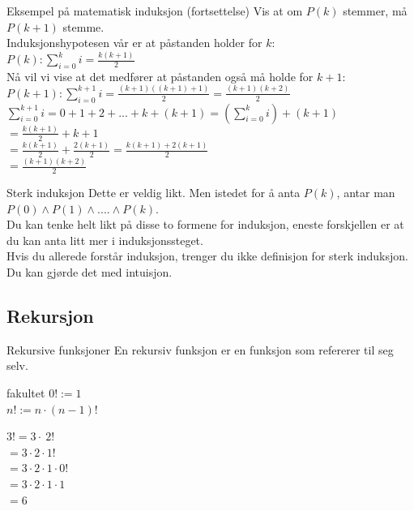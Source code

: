 \begin{frame}{Eksempel på matematisk induksjon (fortsettelse)}
    Vis at om $P(k)$ stemmer, må $P(k+1)$ stemme.\\[2mm]
    Induksjonshypotesen vår er at påstanden holder for $k$: \\
    $P(k): \sum_{i=0}^{k} i = \frac{k(k+1)}{2}$\\[2mm]

    Nå vil vi vise at det medfører at påstanden også må holde for $k+1$:\\
    $P(k+1): \sum_{i=0}^{k+1} i = \frac{(k+1)((k+1)+1)}{2} = \frac{(k+1)(k+2)}{2}$\\

    $\sum_{i=0}^{k+1} i = 0 + 1 + 2 + ... + k + (k+1) = (\sum_{i=0}^{k} i )+ (k+1)$\\
\pause
    $=\frac{k(k+1)}{2} + k + 1$\\
    $= \frac{k(k+1)}{2}+\frac{2(k+1)}{2} = \frac{k(k+1)+2(k+1)}{2}$\\
    $= \frac{(k+1)(k+2)}{2}$ \checkmark
\end{frame}

\begin{frame}{Sterk induksjon}
    Dette er veldig likt. Men istedet for å anta $P(k)$, antar man $P(0) \land P(1) \land .... \land P(k)$.\\
    Du kan tenke helt likt på disse to formene for induksjon, eneste forskjellen er at du kan anta litt mer i induksjonssteget.\\

    Hvis du allerede forstår induksjon, trenger du ikke definisjon for sterk induksjon. Du kan gjørde det med intuisjon.
\end{frame}

\subsection{Rekursjon}
\begin{frame}{Rekursive funksjoner}
    En rekursiv funksjon er en funksjon som refererer til seg selv.
    \pause
    \begin{block}{fakultet}
        $0! := 1$ \\
        $n! := n \cdot (n-1)!$
    \end{block}    
    \pause 
    $3! = 3 \cdot ~ 2!$\\
    $= 3 \cdot 2 \cdot 1!$\\
    $= 3 \cdot 2 \cdot 1 \cdot 0!$\\
    $= 3 \cdot 2 \cdot 1 \cdot 1$\\
    $= 6$
\end{frame}

